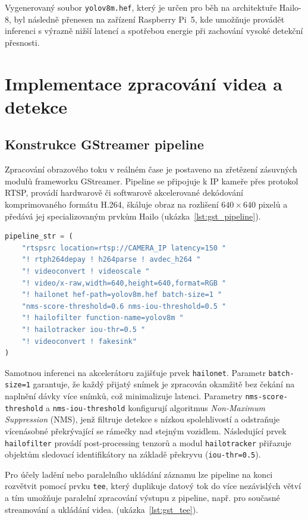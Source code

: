 \documentclass[male,czech,api_bc]{kitheses}
\begin{document}
Vygenerovaný soubor \texttt{yolov8m.hef}, který je určen pro běh na architektuře Hailo-8, byl následně přenesen na zařízení Raspberry Pi~5, kde umožňuje provádět inferenci s výrazně nižší latencí a spotřebou energie při zachování vysoké detekční přesnosti.

\section{Implementace zpracování videa a detekce}

\subsection{Konstrukce GStreamer pipeline}
Zpracování obrazového toku v reálném čase je postaveno na zřetězení zásuvných modulů frameworku GStreamer. Pipeline se připojuje k IP kameře přes protokol RTSP, provádí hardwarově či softwarově akcelerované dekódování komprimovaného formátu H.264, škáluje obraz na rozlišení $640 \times 640$ pixelů a předává jej specializovaným prvkům Hailo (ukázka~\ref{lst:gst_pipeline}).


\begin{lstlisting}[language=Python, caption={Zjednodušená konstrukce GStreamer pipeline.}, label={lst:gst_pipeline}]
pipeline_str = (
    "rtspsrc location=rtsp://CAMERA_IP latency=150 "
    "! rtph264depay ! h264parse ! avdec_h264 "
    "! videoconvert ! videoscale "
    "! video/x-raw,width=640,height=640,format=RGB "
    "! hailonet hef-path=yolov8m.hef batch-size=1 "
    "nms-score-threshold=0.6 nms-iou-threshold=0.5 "
    "! hailofilter function-name=yolov8m "
    "! hailotracker iou-thr=0.5 "
    "! videoconvert ! fakesink"
)
\end{lstlisting}

Samotnou inferenci na akcelerátoru zajišťuje prvek \texttt{hailonet}. Parametr \texttt{batch-size=1} garantuje, že každý přijatý snímek je zpracován okamžitě bez čekání na naplnění dávky více snímků, což minimalizuje latenci. Parametry \texttt{nms-score-threshold} a \texttt{nms-iou-threshold} konfigurují algoritmus \textit{Non-Maximum Suppression} (NMS), jenž filtruje detekce s nízkou spolehlivostí a odstraňuje vícenásobné překrývající se rámečky nad stejným vozidlem. Následující prvek \texttt{hailofilter} provádí post-processing tenzorů a modul \texttt{hailotracker} přiřazuje objektům sledovací identifikátory na základě překryvu (\texttt{iou-thr=0.5}).

Pro účely ladění nebo paralelního ukládání záznamu lze pipeline na konci rozvětvit pomocí prvku \texttt{tee}, který duplikuje datový tok do více nezávislých větví a tím umožňuje paralelní zpracování výstupu z pipeline, např. pro současné streamování a ukládání videa. (ukázka~\ref{lst:gst_tee}).
\end{document}
